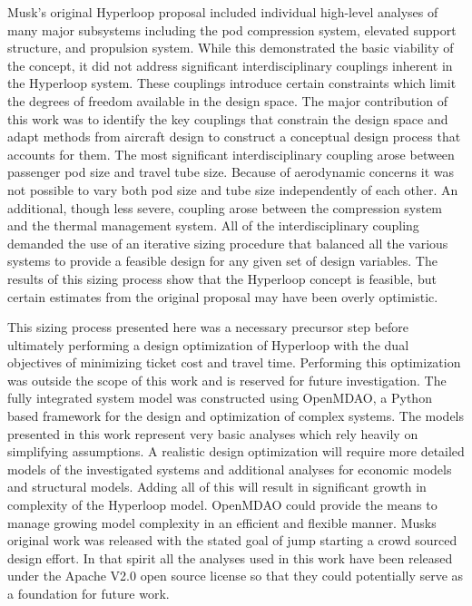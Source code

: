 \documentclass[heading.tex]{subfiles}
\begin{document}
Musk’s original Hyperloop proposal included individual high-level analyses of many major subsystems including the pod compression system,
elevated support structure, and propulsion system. While this demonstrated the basic viability of the concept, it did not address
significant interdisciplinary couplings inherent in the Hyperloop system. These couplings introduce certain constraints which limit the 
degrees of freedom available in the design space. The major contribution of this work was to identify the key couplings that constrain the design space
and adapt methods from aircraft design to construct a conceptual design process that accounts for them. The most significant 
interdisciplinary coupling arose between passenger pod size and travel tube size. Because of aerodynamic concerns it was not possible to vary 
both pod size and tube size independently of each other. An additional, though less severe, coupling arose between the compression system and 
the thermal management system. All of the interdisciplinary coupling demanded the use of an iterative sizing procedure that balanced 
all the various systems to provide a feasible design for any given set of design variables. The results of this sizing process show that
the Hyperloop concept is feasible, but certain estimates from the original proposal may have been overly optimistic. 

This sizing process presented here was a necessary precursor step before ultimately performing a design optimization of 
Hyperloop with the dual objectives of minimizing ticket cost and travel time. Performing this optimization 
was outside the scope of this work and is reserved for future investigation. 
The fully integrated system model was constructed using OpenMDAO, a Python based framework for 
the design and optimization of complex systems\cite{GrayBenmarking2013}. The models presented 
in this work represent very basic analyses which rely heavily on simplifying assumptions. A realistic design 
optimization will require more detailed models of the investigated systems and additional analyses for economic models and 
structural models. Adding all of this will result in significant growth in complexity of the Hyperloop model. 
OpenMDAO could provide the means to manage growing model complexity 
in an efficient and flexible manner. Musks original work was released with the stated goal of jump starting
a crowd sourced design effort. In that spirit all the analyses used in this work have been released under
the Apache V2.0 open source license so that they could potentially serve as a foundation for future work.
\end{document}
